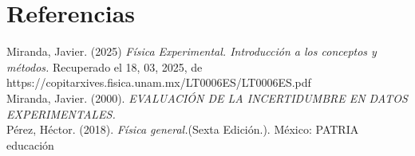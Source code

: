 \documentclass[12pt,a4paper]{article}
\begin{document}
\section{Referencias}

Miranda, Javier. (2025) \textit{Física Experimental. Introducción a los conceptos y métodos.} Recuperado el 18, 03, 2025, de https://copitarxives.fisica.unam.mx/LT0006ES/LT0006ES.pdf \\

Miranda, Javier. (2000). \textit{EVALUACIÓN DE LA INCERTIDUMBRE EN DATOS EXPERIMENTALES.} \\

Pérez, Héctor. (2018). \textit{Física general.}(Sexta Edición.). México: PATRIA educación \\
\end{document}
